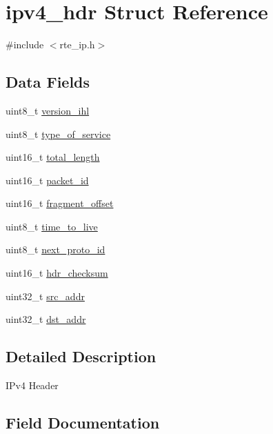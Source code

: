\hypertarget{structipv4__hdr}{}\section{ipv4\+\_\+hdr Struct Reference}
\label{structipv4__hdr}


{\ttfamily \#include $<$rte\+\_\+ip.\+h$>$}

\subsection*{Data Fields}
\begin{DoxyCompactItemize}
\item 
uint8\+\_\+t \hyperlink{structipv4__hdr_a0f143df6fd0e09aba2963a160e33ce16}{version\+\_\+ihl}
\item 
uint8\+\_\+t \hyperlink{structipv4__hdr_ad9000ab1449737219532b889f0da0f02}{type\+\_\+of\+\_\+service}
\item 
uint16\+\_\+t \hyperlink{structipv4__hdr_aa487bb47bd88257a2fcd58d10c7836a2}{total\+\_\+length}
\item 
uint16\+\_\+t \hyperlink{structipv4__hdr_ad051e090f3817f4549df7dc178790f45}{packet\+\_\+id}
\item 
uint16\+\_\+t \hyperlink{structipv4__hdr_a5e6d9f74c7f28441e7adf6ae4867cc78}{fragment\+\_\+offset}
\item 
uint8\+\_\+t \hyperlink{structipv4__hdr_a001bd5ec646244861baba152872aaf0e}{time\+\_\+to\+\_\+live}
\item 
uint8\+\_\+t \hyperlink{structipv4__hdr_a513eb1be3a24fe8df91530edd4517ade}{next\+\_\+proto\+\_\+id}
\item 
uint16\+\_\+t \hyperlink{structipv4__hdr_ab900fdcbfb9fd1da87d839741353acd0}{hdr\+\_\+checksum}
\item 
uint32\+\_\+t \hyperlink{structipv4__hdr_a6a462ff6ecd832025b4f8934f226d5b5}{src\+\_\+addr}
\item 
uint32\+\_\+t \hyperlink{structipv4__hdr_ad3367f6b5057b9c73b012338e5a437ae}{dst\+\_\+addr}
\end{DoxyCompactItemize}


\subsection{Detailed Description}
I\+Pv4 Header 

\subsection{Field Documentation}
\hypertarget{structipv4__hdr_ad3367f6b5057b9c73b012338e5a437ae}{}
